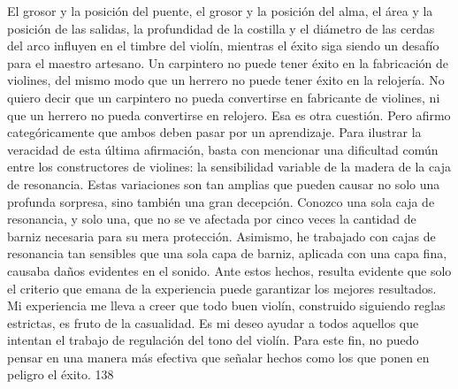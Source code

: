 El grosor y la posición del puente, el grosor y la posición del alma, el área y la posición de las salidas, la profundidad de la costilla y el diámetro de las cerdas del arco influyen en el timbre del violín, mientras el éxito siga siendo un desafío para el maestro artesano. Un carpintero no puede tener éxito en la fabricación de violines, del mismo modo que un herrero no puede tener éxito en la relojería. No quiero decir que un carpintero no pueda convertirse en fabricante de violines, ni que un herrero no pueda convertirse en relojero. Esa es otra cuestión. Pero afirmo categóricamente que ambos deben pasar por un aprendizaje.
Para ilustrar la veracidad de esta última afirmación, basta con mencionar una dificultad común entre los constructores de violines: la sensibilidad variable de la madera de la caja de resonancia. Estas variaciones son tan amplias que pueden causar no solo una profunda sorpresa, sino también una gran decepción. Conozco una sola caja de resonancia, y solo una, que no se ve afectada por cinco veces la cantidad de barniz necesaria para su mera protección. Asimismo, he trabajado con cajas de resonancia tan sensibles que una sola capa de barniz, aplicada con una capa fina, causaba daños evidentes en el sonido. Ante estos hechos, resulta evidente que solo el criterio que emana de la experiencia puede garantizar los mejores resultados. Mi experiencia me lleva a creer que todo buen violín, construido siguiendo reglas estrictas, es fruto de la casualidad.
Es mi deseo ayudar a todos aquellos que intentan el trabajo de regulación del tono del violín. Para este fin, no puedo pensar en una manera más efectiva que señalar hechos como los que ponen en peligro el éxito.
138

